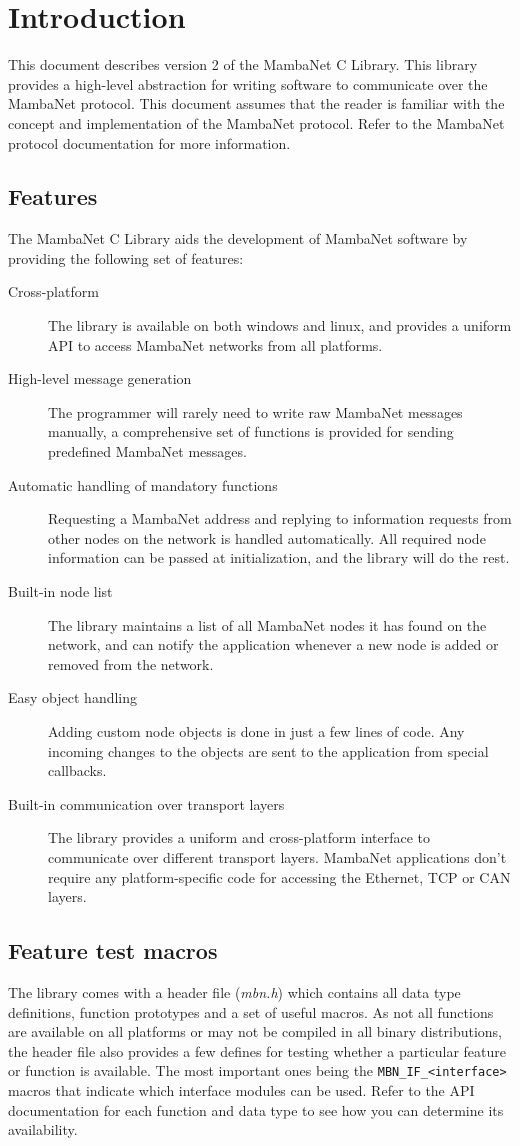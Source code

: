 \chapter{Introduction}
This document describes version 2 of the MambaNet C Library. This library provides a high-level abstraction for writing software to communicate over the MambaNet protocol. This document assumes that the reader is familiar with the concept and implementation of the MambaNet protocol. Refer to the MambaNet protocol documentation for more information.


\section{Features}
The MambaNet C Library aids the development of MambaNet software by providing the following set of features:
\begin{description}
 \item[Cross-platform]
  The library is available on both windows and linux, and provides a uniform API to access MambaNet networks from all platforms.
 \item[High-level message generation]
  The programmer will rarely need to write raw MambaNet messages manually, a comprehensive set of functions is provided for sending predefined MambaNet messages.
 \item[Automatic handling of mandatory functions]
  Requesting a MambaNet address and replying to information requests from other nodes on the network is handled automatically. All required node information can be passed at initialization, and the library will do the rest.
 \item[Built-in node list]
  The library maintains a list of all MambaNet nodes it has found on the network, and can notify the application whenever a new node is added or removed from the network.
 \item[Easy object handling]
  Adding custom node objects is done in just a few lines of code. Any incoming changes to the objects are sent to the application from special callbacks.
 \item[Built-in communication over transport layers]
  The library provides a uniform and cross-platform interface to communicate over different transport layers. MambaNet applications don't require any platform-specific code for accessing the Ethernet, TCP or CAN layers.
\end{description}


\section{Feature test macros}
The library comes with a header file (\textit{mbn.h}) which contains all data type definitions, function prototypes and a set of useful macros. As not all functions are available on all platforms or may not be compiled in all binary distributions, the header file also provides a few defines for testing whether a particular feature or function is available. The most important ones being the \verb|MBN_IF_<interface>| macros that indicate which interface modules can be used. Refer to the API documentation for each function and data type to see how you can determine its availability.


